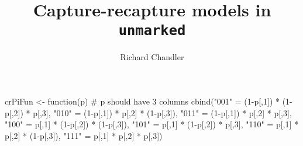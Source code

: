 \documentclass[a4paper]{article}
\title{Capture-recapture models in {\tt unmarked}}
\author{Richard Chandler}
\begin{document}
crPiFun <- function(p) { # p should have 3 columns
    cbind("001" = (1-p[,1]) * (1-p[,2]) * p[,3],
          "010" = (1-p[,1]) * p[,2]     * (1-p[,3]),
          "011" = (1-p[,1]) * p[,2]     * p[,3],
          "100" = p[,1]     * (1-p[,2]) * (1-p[,3]),
          "101" = p[,1]     * (1-p[,2]) * p[,3],
          "110" = p[,1]     * p[,2]     * (1-p[,3]),
          "111" = p[,1]     * p[,2]     * p[,3])
}

\end{document}
